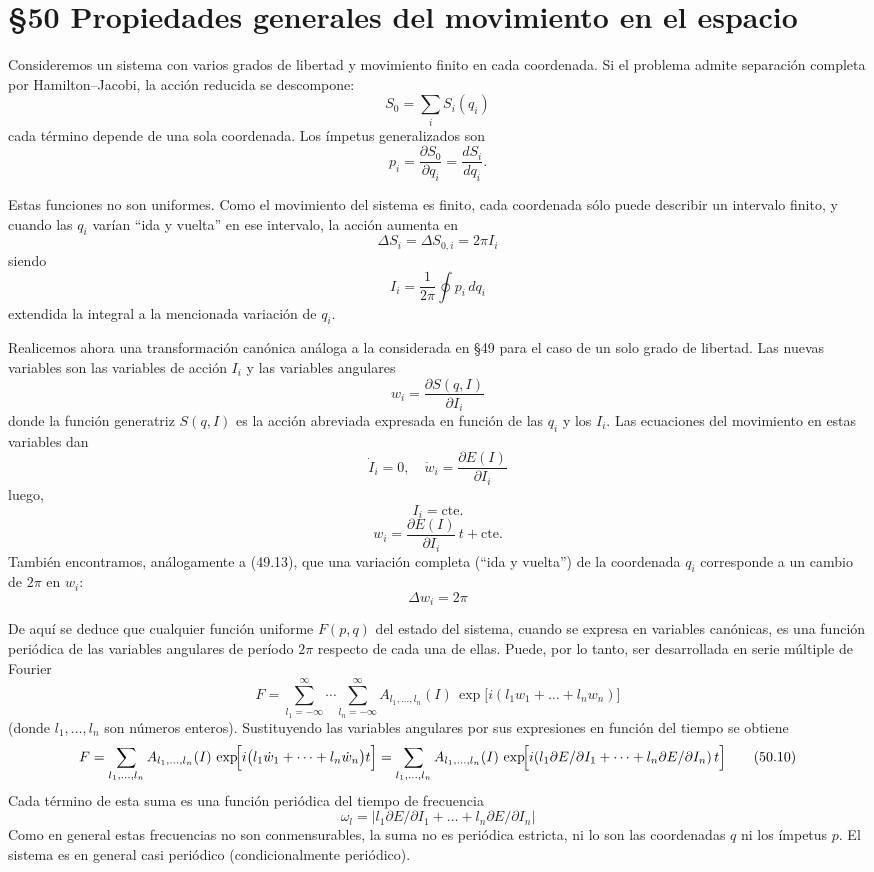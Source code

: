 \documentclass[12pt]{article}
\begin{document}
\section*{§50 Propiedades generales del movimiento en el espacio}

Consideremos un sistema con varios grados de libertad y movimiento finito en cada coordenada. Si el problema admite separación completa por Hamilton–Jacobi, la acción reducida se descompone:
\[
S_0 = \sum_i S_i(q_i)
\tag{50.1}
\]
cada término depende de una sola coordenada. Los ímpetus generalizados son
\[
p_i = \frac{\partial S_0}{\partial q_i}
    = \frac{dS_i}{dq_i}.
\]

Estas funciones no son uniformes. Como el movimiento del sistema es finito, cada coordenada sólo puede describir un intervalo finito, y cuando las \(q_i\) varían “ida y vuelta” en ese intervalo, la acción aumenta en
\[
\Delta S_i = \Delta S_{0,i} = 2\pi I_i
\tag{50.3}
\]
siendo
\[
I_i = \frac{1}{2\pi}\oint p_i\,dq_i
\tag{50.4}
\]
extendida la integral a la mencionada variación de \(q_i\).

Realicemos ahora una transformación canónica análoga a la considerada en §49 para el caso de un solo grado de libertad. Las nuevas variables son las variables de acción \(I_i\) y las variables angulares
\[
w_i = \frac{\partial S(q,I)}{\partial I_i}
\tag{50.5}
\]
donde la función generatriz \(S(q,I)\) es la acción abreviada expresada en función de las \(q_i\) y los \(I_i\). Las ecuaciones del movimiento en estas variables dan
\[
\dot I_i = 0,\quad
\dot w_i = \frac{\partial E(I)}{\partial I_i}
\]
luego,
\[
I_i = \text{cte.}
\tag{50.6}
\]
\[
w_i = \frac{\partial E(I)}{\partial I_i}\,t + \text{cte.}
\tag{50.7}
\]
También encontramos, análogamente a (49.13), que una variación completa (“ida y vuelta”) de la coordenada \(q_i\) corresponde a un cambio de \(2\pi\) en \(w_i\):
\[
\Delta w_i = 2\pi
\tag{50.8}
\]

De aquí se deduce que cualquier función uniforme \(F(p,q)\) del estado del sistema, cuando se expresa en variables canónicas, es una función periódica de las variables angulares de período \(2\pi\) respecto de cada una de ellas. Puede, por lo tanto, ser desarrollada en serie múltiple de Fourier
\[
F = \sum_{l_1=-\infty}^{\infty}\cdots\sum_{l_n=-\infty}^{\infty}
    A_{l_1,\dots,l_n}(I)\,\exp\bigl[i(l_1w_1+\dots+l_nw_n)\bigr]
\tag{50.9}
\]
(donde \(l_1,\dots,l_n\) son números enteros). Sustituyendo las variables angulares por sus expresiones en función del tiempo se obtiene
\[
F = \sum_{l_1,\dots,l_n}
    A_{l_1,\dots,l_n}(I)\,
    \exp\!\Bigl[i\bigl(l_1\dot w_1+\dots+l_n\dot w_n\bigr)t\Bigr]
  = \sum_{l_1,\dots,l_n}
    A_{l_1,\dots,l_n}(I)\,
    \exp\!\Bigl[i(l_1\partial E/\partial I_1+\dots+l_n\partial E/\partial I_n)\,t\Bigr]
\tag{50.10}
\]
Cada término de esta suma es una función periódica del tiempo de frecuencia
\[
\omega_{l} = \bigl|l_1\partial E/\partial I_1+\dots+l_n\partial E/\partial I_n\bigr|
\tag{50.11}
\]
Como en general estas frecuencias no son conmensurables, la suma no es periódica estricta, ni lo son las coordenadas \(q\) ni los ímpetus \(p\). El sistema es en general casi periódico (condicionalmente periódico).
\end{document}
